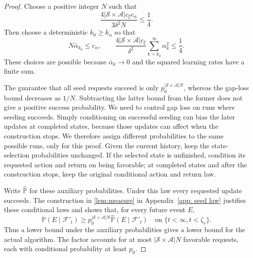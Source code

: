 \begin{proof}
Choose a positive integer $N$ such that
\[
\frac{4|\mathcal S\times\mathcal A|c_\xi c_\alpha}{3\delta^2 N}\le\frac14.
\]
Then choose a deterministic $k_0\ge k_\alpha$ so that
\begin{equation}
\label{eq:choices}
N\bar\alpha_{k_0}\le c_\alpha,
\qquad
\frac{4|\mathcal S\times\mathcal A|c_\xi}{\delta^2}\sum_{k=k_0}^\infty\alpha_k^2\le\frac14.
\end{equation}
These choices are possible because $\bar\alpha_k\to0$ and the squared learning rates have a finite sum.

The guarantee that all seed requests succeed is only $p_0^{|\mathcal S\times\mathcal A|N}$, whereas the gap-loss bound decreases as $1/N$. Subtracting the latter bound from the former does not give a positive success probability. We need to control gap loss on runs where seeding succeeds. Simply conditioning on successful seeding can bias the later updates at completed states, because those updates can affect when the construction stops. We therefore assign different probabilities to the same possible runs, only for this proof. Given the current history, keep the state-selection probabilities unchanged. If the selected state is unfinished, condition its requested action and return on being favorable; at completed states and after the construction stops, keep the original conditional action and return law.

Write $\widehat{\mathbb P}$ for these auxiliary probabilities. Under this law every requested update succeeds. The construction in \autoref{lem:measure} in Appendix~\ref{app: seed law} justifies these conditional laws and shows that, for every future event $E$,
\begin{equation}
\label{eq:transfer}
\mathbb P(E\mid\mathcal F'_t)
\ge p_0^{|\mathcal S\times\mathcal A|N}\widehat{\mathbb P}(E\mid\mathcal F'_t)
\quad\text{on }\{t<\infty,t<\zeta_r\}.
\end{equation}
Thus a lower bound under the auxiliary probabilities gives a lower bound for the actual algorithm. The factor accounts for at most $|\mathcal S\times\mathcal A|N$ favorable requests, each with conditional probability at least $p_0$.


\end{proof}

